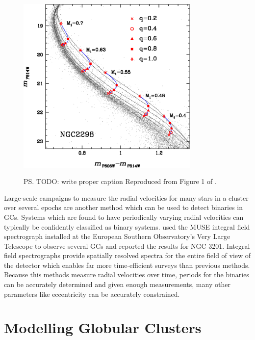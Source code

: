 \begin{figure}
	\centering
	\includegraphics[width=0.8\textwidth]{"./figures/main_sequence_binaries.pdf"}
	\label{fig:1/main_sequence_binaries}
\caption{\ps{TODO: write proper caption} Reproduced from Figure 1 of \citet{Milone2012}.}
\end{figure}


Large-scale campaigns to measure the radial velocities for many stars in a cluster over several
epochs are another method which can be used to detect binaries in GCs. Systems which are found to
have periodically varying radial velocities can typically be confidently classified as binary
systems. \citet{Giesers2019} used the MUSE integral field spectrograph installed at the European
Southern Observatory's Very Large Telescope to observe several GCs and reported the results for NGC
3201. Integral field spectrographs provide spatially resolved spectra for the entire field of view
of the detector which enables far more time-efficient surveys than previous methods. Because this
methods measure radial velocities over time, periods for the binaries can be accurately determined
and given enough measurements, many other parameters like eccentricity can be accurately
constrained.



\section{Modelling Globular Clusters}

\paragraph{}


